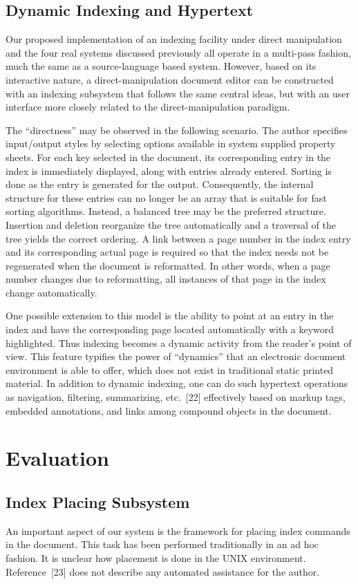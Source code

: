 \subsection{Dynamic Indexing and Hypertext}
Our proposed implementation of an indexing facility under direct manipulation
and the four real systems discussed previously all operate
in a multi-pass fashion, much the same as a source-language based system.
However, based on its interactive nature, a direct-manipulation document
editor can be constructed with an indexing subsystem that follows the same
central ideas, but with an user interface more closely related to the
direct-manipulation paradigm.

The ``directness'' may be observed in the following scenario.
The author specifies input/output styles by selecting options available
in system supplied property sheets.  For each key selected
in the document, its corresponding entry in the index is immediately
displayed, along with entries already entered.
Sorting is done as the entry is generated for the output.
Consequently, the internal structure for these entries can no longer be
an array that is suitable for fast sorting algorithms.
Instead, a balanced tree may be the preferred structure.
Insertion and deletion reorganize the tree automatically and
a traversal of the tree yields the correct ordering.
A link between a page number in the index entry and its corresponding
actual page is required so that the index needs not be regenerated
when the document is reformatted.  In other words, when a page
number changes due to reformatting, all instances of that page in the index
change automatically.

One possible extension to this model is the ability to point at an entry
in the index and
have the corresponding page located automatically with a keyword highlighted.
Thus indexing becomes a dynamic activity from the reader's point of view.
This feature typifies the power of ``dynamics'' that an electronic document
environment is able to offer, which does not exist in traditional
static printed material.  In addition to dynamic indexing,
one can do such hypertext operations as navigation, filtering, summarizing,
etc.~[22] effectively based on markup tags, embedded annotations, and
links among compound objects in the document.


\section{Evaluation}
\subsection{Index Placing Subsystem}
An important aspect of our system is the framework for
placing index commands in the document.
This task has been performed traditionally in an ad hoc fashion.
It is unclear how placement is done in the
UNIX {\TF} environment.  Reference~[23] does not describe
any automated assistance for the author.


